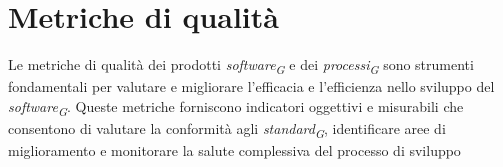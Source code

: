 \section{Metriche di qualità}
Le metriche di qualità dei prodotti \textit{software}\textsubscript{\textit{G}} e dei \textit{processi}\textsubscript{\textit{G}} sono strumenti fondamentali per valutare e migliorare l'efficacia e l'efficienza nello sviluppo del \textit{software}\textsubscript{\textit{G}}. Queste metriche forniscono indicatori oggettivi e misurabili che consentono di valutare la conformità agli \textit{standard}\textsubscript{\textit{G}}, identificare aree di miglioramento e monitorare la salute complessiva del processo di sviluppo



